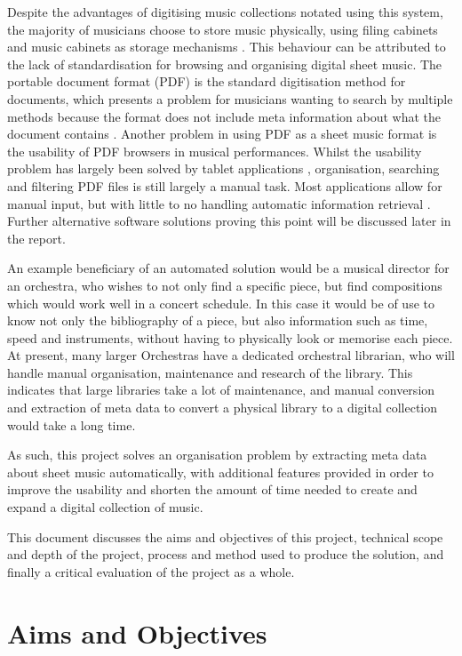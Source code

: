 Despite the advantages of digitising music collections notated using this system, the majority of musicians choose to store music physically, using filing cabinets and music cabinets as storage mechanisms \parencite{musicOrganising}. This behaviour can be attributed to the lack of standardisation for browsing and organising digital sheet music. The portable document format (PDF) is the standard digitisation method for documents, which presents a problem for musicians wanting to search by multiple methods because the format does not include meta information about what the document contains \parencite{MusicXMLPresentation}. Another problem in using PDF as a sheet music format is the usability of PDF browsers in musical performances. Whilst the usability problem has largely been solved by tablet applications \parencite{forScore}, organisation, searching and filtering PDF files is still largely a manual task. Most applications allow for manual input, but with little to no handling automatic information retrieval \parencite{musicReader}. Further alternative software solutions proving this point will be discussed later in the report.

An example beneficiary of an automated solution would be a musical director for an orchestra, who wishes to not only find a specific piece, but find compositions which would work well in a concert schedule. In this case it would be of use to know not only the bibliography of a piece, but also information such as time, speed and instruments, without having to physically look or memorise each piece. At present, many larger Orchestras have a dedicated orchestral librarian\parencite{MusicLibrarian}, who will handle manual organisation, maintenance and research of the library. This indicates that large libraries take a lot of maintenance, and manual conversion and extraction of meta data to convert a physical library to a digital collection would take a long time.

As such, this project solves an organisation problem by extracting meta data about sheet music automatically, with additional features provided in order to improve the usability and shorten the amount of time needed to create and expand a digital collection of music.

This document discusses the aims and objectives of this project, technical scope and depth of the project, process and method used to produce the solution, and finally a critical evaluation of the project as a whole.
\pagebreak
\section{Aims and Objectives}
